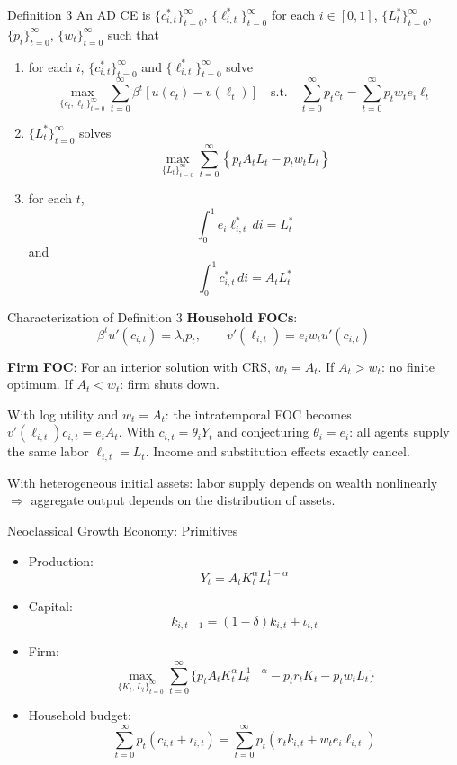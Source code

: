 \documentclass[blue]{beamer}
\begin{document}
\begin{frame}{Definition 3}
	\small
	An AD CE is $\{c_{i,t}^*\}_{t=0}^{\infty}$, $\{\ell_{i,t}^*\}_{t=0}^{\infty}$ for each $i \in [0,1]$, $\{L_t^*\}_{t=0}^{\infty}$, $\{p_t\}_{t=0}^{\infty}$, $\{w_t\}_{t=0}^{\infty}$ such that
	
	\begin{enumerate}
		\item for each $i$, $\{c_{i,t}^*\}_{t=0}^{\infty}$ and $\{\ell_{i,t}^*\}_{t=0}^{\infty}$ solve
		\[
		\max_{\{c_t, \ell_t\}_{t=0}^{\infty}} \sum_{t=0}^{\infty} \beta^t [u(c_t) - v(\ell_t)] \quad \text{s.t.} \quad \sum_{t=0}^{\infty} p_t c_t = \sum_{t=0}^{\infty} p_t w_t e_i \ell_t
		\]
		
		\item $\{L_t^*\}_{t=0}^{\infty}$ solves
		\[
		\max_{\{L_t\}_{t=0}^{\infty}} \sum_{t=0}^{\infty} \left\{ p_t A_t L_t - p_t w_t L_t \right\}
		\]
		
		\item for each $t$, 
		$$
		\int_0^1 e_i \ell_{i,t}^* \, di = L_t^*
		$$
		and 
		$$
		\int_0^1 c_{i,t}^* \, di = A_t L_t^*
		$$
	\end{enumerate}
\end{frame}

\begin{frame}{Characterization of Definition 3}
	\textbf{Household FOCs}:
	\[
	\beta^t u'(c_{i,t}) = \lambda_i p_t, \qquad v'(\ell_{i,t}) = e_i w_t u'(c_{i,t})
	\]
	
	\textbf{Firm FOC}: For an interior solution with CRS, $w_t = A_t$. If $A_t > w_t$: no finite optimum. If $A_t < w_t$: firm shuts down.
	
	\bigskip
	With log utility and $w_t = A_t$: the intratemporal FOC becomes $v'(\ell_{i,t}) c_{i,t} = e_i A_t$. With $c_{i,t} = \theta_i Y_t$ and conjecturing $\theta_i = e_i$: all agents supply the same labor $\ell_{i,t} = L_t$. Income and substitution effects exactly cancel.
	
	\bigskip
	With heterogeneous initial assets: labor supply depends on wealth nonlinearly $\Rightarrow$ aggregate output depends on the distribution of assets.
\end{frame}

\begin{frame}{Neoclassical Growth Economy: Primitives}
	\begin{itemize}
		\item Production: 
		$$
		Y_t = A_t K_t^{\alpha} L_t^{1-\alpha}
		$$
		\item Capital: 
		$$
		k_{i,t+1} = (1-\delta) k_{i,t} + \iota_{i,t}
		$$
		\item Firm: 
		$$
		\max_{\{K_t, L_t\}_{t=0}^{\infty}} \sum_{t=0}^{\infty} \{ p_t A_t K_t^{\alpha} L_t^{1-\alpha} - p_t r_t K_t - p_t w_t L_t \}
		$$
		\item Household budget: 
		$$
		\sum_{t=0}^{\infty} p_t(c_{i,t} + \iota_{i,t}) = \sum_{t=0}^{\infty} p_t(r_t k_{i,t} + w_t e_i \ell_{i,t})
		$$
	\end{itemize}
\end{frame}
\end{document}
